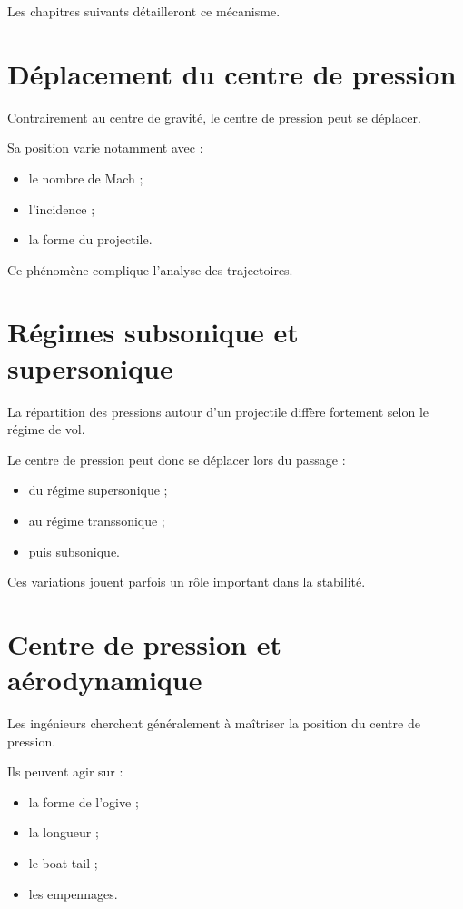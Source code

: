 Les chapitres suivants détailleront ce mécanisme.

\section{Déplacement du centre de pression}

Contrairement au centre de gravité, le centre de pression peut se déplacer.

Sa position varie notamment avec :

\begin{itemize}
    \item le nombre de Mach ;
    \item l'incidence ;
    \item la forme du projectile.
\end{itemize}

Ce phénomène complique l'analyse des trajectoires.

\section{Régimes subsonique et supersonique}

La répartition des pressions autour d'un projectile diffère fortement selon
le régime de vol.

Le centre de pression peut donc se déplacer lors du passage :

\begin{itemize}
    \item du régime supersonique ;
    \item au régime transsonique ;
    \item puis subsonique.
\end{itemize}

Ces variations jouent parfois un rôle important dans la stabilité.

\section{Centre de pression et aérodynamique}

Les ingénieurs cherchent généralement à maîtriser la position du centre de
pression.

Ils peuvent agir sur :

\begin{itemize}
    \item la forme de l'ogive ;
    \item la longueur ;
    \item le boat-tail ;
    \item les empennages.
\end{itemize}

